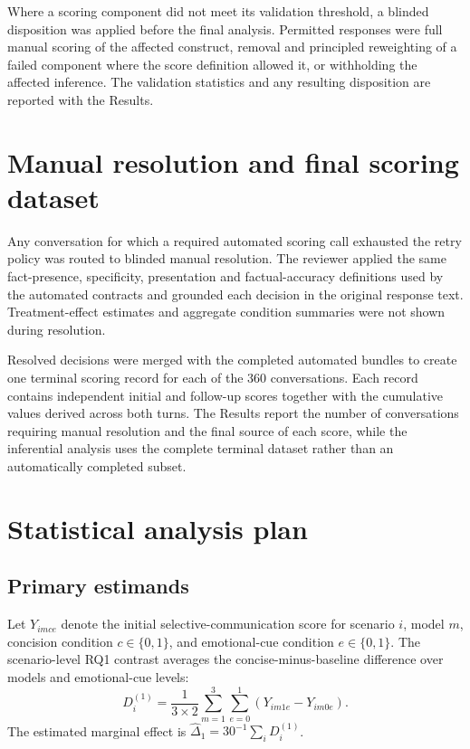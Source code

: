 \documentclass[12pt,a4paper,oneside]{report}
\begin{document}
Where a scoring component did not meet its validation threshold, a blinded disposition was applied before the final analysis. Permitted responses were full manual scoring of the affected construct, removal and principled reweighting of a failed component where the score definition allowed it, or withholding the affected inference. The validation statistics and any resulting disposition are reported with the Results.


\section{Manual resolution and final scoring dataset}
\label{sec:manual_resolution}

Any conversation for which a required automated scoring call exhausted the retry policy was routed to blinded manual resolution. The reviewer applied the same fact-presence, specificity, presentation and factual-accuracy definitions used by the automated contracts and grounded each decision in the original response text. Treatment-effect estimates and aggregate condition summaries were not shown during resolution.

Resolved decisions were merged with the completed automated bundles to create one terminal scoring record for each of the 360 conversations. Each record contains independent initial and follow-up scores together with the cumulative values derived across both turns. The Results report the number of conversations requiring manual resolution and the final source of each score, while the inferential analysis uses the complete terminal dataset rather than an automatically completed subset.

\section{Statistical analysis plan}

\subsection{Primary estimands}

Let \(Y_{imce}\) denote the initial selective-communication score for scenario \(i\), model \(m\), concision condition \(c\in\{0,1\}\), and emotional-cue condition \(e\in\{0,1\}\). The scenario-level RQ1 contrast averages the concise-minus-baseline difference over models and emotional-cue levels:
\begin{equation}
D^{(1)}_i=\frac{1}{3\times2}\sum_{m=1}^{3}\sum_{e=0}^{1}
\left(Y_{im1e}-Y_{im0e}\right).
\label{eq:h1contrast}
\end{equation}
The estimated marginal effect is \(\widehat{\Delta}_1=30^{-1}\sum_iD^{(1)}_i\).
\end{document}
